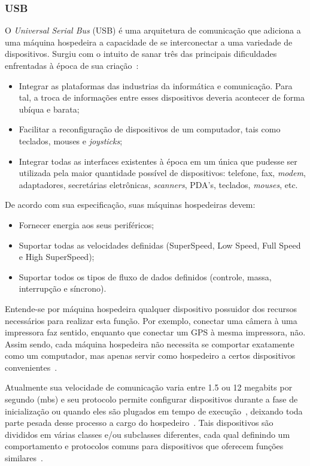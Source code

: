 \subsubsection{USB}

O \emph{Universal Serial Bus} (USB) é uma arquitetura de comunicação que adiciona a uma máquina hospedeira a capacidade de se interconectar a uma variedade de dispositivos. Surgiu com o intuito de sanar três das principais dificuldades enfrentadas à época de sua criação~\cite{usbspec}:

\begin{itemize}
	\item Integrar as plataformas das industrias da informática e comunicação. Para tal, a troca de informações entre esses dispositivos deveria acontecer de forma ubíqua e barata;
	\item Facilitar a reconfiguração de dispositivos de um computador, tais como teclados, mouses e \emph{joysticks};
	\item Integrar todas as interfaces existentes à época em um única que pudesse ser utilizada pela maior quantidade possível de dispositivos: telefone, fax, \emph{modem}, adaptadores, secretárias eletrônicas, \emph{scanners}, PDA's, teclados, \emph{mouses}, etc.
\end{itemize}

De acordo com sua especificação, suas máquinas hospedeiras devem:

\begin{itemize}
	\item Fornecer energia aos seus periféricos;
	\item Suportar todas as velocidades definidas (SuperSpeed, Low Speed, Full Speed e High SuperSpeed);
	\item Suportar todos os tipos de fluxo de dados definidos (controle, massa, interrupção e síncrono).
\end{itemize}

Entende-se por máquina hospedeira qualquer dispositivo possuidor dos recursos necessários para realizar esta função. Por exemplo, conectar uma câmera à uma impressora faz sentido, enquanto que conectar um GPS à mesma impressora, não. Assim sendo, cada máquina hospedeira não necessita se comportar exatamente como um computador, mas apenas servir como hospedeiro a certos dispositivos convenientes~\cite{usb3spec}.

Atualmente sua velocidade de comunicação varia entre 1.5 ou 12 megabits por segundo (mbs) e seu protocolo permite configurar dispositivos durante a fase de inicialização ou quando eles são plugados em tempo de execução~\cite{hid}, deixando toda parte pesada desse processo a cargo do hospedeiro~\cite{usb3spec}. Tais dispositivos são divididos em várias classes e/ou subclasses diferentes, cada qual definindo um comportamento e protocolos comuns para dispositivos que oferecem funções similares~\cite{hid}.

